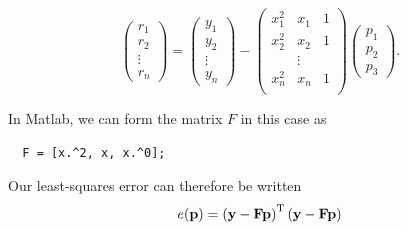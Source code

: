 \documentclass[12pt,a4paper]{tufte-handout}
\begin{document}
\begin{equation}
  \begin{pmatrix}
    r_1 \\ r_2 \\ \vdots \\ r_n
  \end{pmatrix}
  =
  \begin{pmatrix}
    y_1 \\ y_2 \\ \vdots \\ y_n
  \end{pmatrix}
  -
  \begin{pmatrix}
    x_1^2 & x_1 & 1 \\
    x_2^2 & x_2 & 1 \\
    &\vdots &\\
    x_n^2 & x_n & 1 \\
  \end{pmatrix}
  \begin{pmatrix}
    p_1 \\ p_2 \\ p_3
  \end{pmatrix}.
\end{equation}

In Matlab, we can form the matrix $F$ in this case as
\begin{lstlisting}
  F = [x.^2, x, x.^0];
\end{lstlisting}

Our least-squares error can therefore be written
\begin{equation}
  e(\mathbf{p}) = \left(\mathbf{y}-\mathbf{F}\mathbf{p}\right)^{\mathrm{T}} \left(\mathbf{y}-\mathbf{F}\mathbf{p}\right)
\end{equation}
\end{document}
